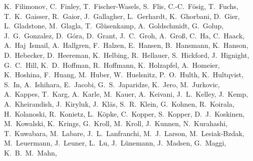 \documentclass[manuscript]{aastex}
\begin{document}
{K.~Filimonov,
C.~Finley,
T.~Fischer-Wasels,
S.~Flis,
C.-C.~F\"osig,
T.~Fuchs,
T.~K.~Gaisser,
R.~Gaior,
J.~Gallagher,
L.~Gerhardt,
K.~Ghorbani,
D.~Gier,
L.~Gladstone,
M.~Glagla,
T.~Gl\"usenkamp,
A.~Goldschmidt,
G.~Golup,
J.~G.~Gonzalez,
D.~G\'ora,
D.~Grant,
J.~C.~Groh,
A.~Gro{\ss},
C.~Ha,
C.~Haack,
A.~Haj~Ismail,
A.~Hallgren,
F.~Halzen,
E.~Hansen,
B.~Hansmann,
K.~Hanson,
D.~Hebecker,
D.~Heereman,
K.~Helbing,
R.~Hellauer,
S.~Hickford,
J.~Hignight,
G.~C.~Hill,
K.~D.~Hoffman,
R.~Hoffmann,
K.~Holzapfel,
A.~Homeier,
K.~Hoshina,
F.~Huang,
M.~Huber,
W.~Huelsnitz,
P.~O.~Hulth,
K.~Hultqvist,
S.~In,
A.~Ishihara,
E.~Jacobi,
G.~S.~Japaridze,
K.~Jero,
M.~Jurkovic,
A.~Kappes,
T.~Karg,
A.~Karle,
M.~Kauer,
A.~Keivani,
J.~L.~Kelley,
J.~Kemp,
A.~Kheirandish,
J.~Kiryluk,
J.~Kl\"as,
S.~R.~Klein,
G.~Kohnen,
R.~Koirala,
H.~Kolanoski,
R.~Konietz,
L.~K\"opke,
C.~Kopper,
S.~Kopper,
D.~J.~Koskinen,
M.~Kowalski,
K.~Krings,
G.~Kroll,
M.~Kroll,
J.~Kunnen,
N.~Kurahashi,
T.~Kuwabara,
M.~Labare,
J.~L.~Lanfranchi,
M.~J.~Larson,
M.~Lesiak-Bzdak,
M.~Leuermann,
J.~Leuner,
L.~Lu,
J.~L\"unemann,
J.~Madsen,
G.~Maggi,
K.~B.~M.~Mahn,
}
\end{document}
